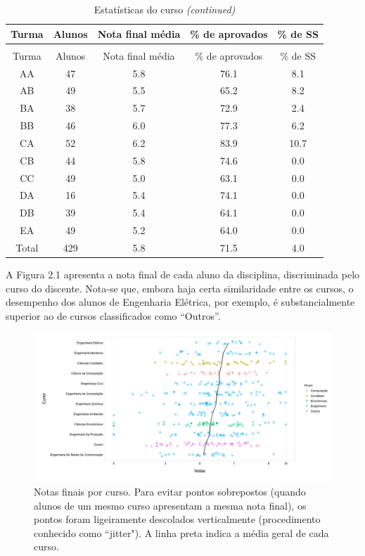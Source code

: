\documentclass[a4paper]{report}
\begin{document}
\begin{longtable}{c|c|c|c|c}
\caption{\label{tab:unnamed-chunk-4}Estatísticas do curso}\\
\hline
Turma & Alunos & Nota final média & \% de aprovados & \% de SS\\
\hline
\endfirsthead
\caption[]{Estatísticas do curso \textit{(continued)}}\\
\hline
Turma & Alunos & Nota final média & \% de aprovados & \% de SS\\
\hline
\endhead
AA & 47 & 5.8 & 76.1 & 8.1\\
\hline
AB & 49 & 5.5 & 65.2 & 8.2\\
\hline
BA & 38 & 5.7 & 72.9 & 2.4\\
\hline
BB & 46 & 6.0 & 77.3 & 6.2\\
\hline
CA & 52 & 6.2 & 83.9 & 10.7\\
\hline
CB & 44 & 5.8 & 74.6 & 0.0\\
\hline
CC & 49 & 5.0 & 63.1 & 0.0\\
\hline
DA & 16 & 5.4 & 74.1 & 0.0\\
\hline
DB & 39 & 5.4 & 64.1 & 0.0\\
\hline
EA & 49 & 5.2 & 64.0 & 0.0\\
\hline
Total & 429 & 5.8 & 71.5 & 4.0\\
\hline
\end{longtable}

A Figura 2.1 apresenta a nota final de cada aluno da disciplina,
discriminada pelo curso do discente. Nota-se que, embora haja certa
similaridade entre os cursos, o desempenho dos alunos de Engenharia
Elétrica, por exemplo, é substancialmente superior ao de cursos
classificados como ``Outros''.

\begin{figure} 
\includegraphics{Notas_cursos.png} 
\caption{Notas finais por curso. Para evitar pontos sobrepostos (quando alunos de um mesmo curso apresentam a mesma nota final), os pontos foram ligeiramente descolados verticalmente (procedimento conhecido como ``jitter"). A linha preta indica a média geral de cada curso.}
\label{fig:notas_cursos}
\end{figure}
\end{document}
